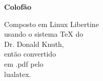 \vspace*{\fill}
	\begin{flushright}
	{\Large\textbf{Colofão}}

	{\large 
	Composto em Linux Libertine \\
	usando o sistema \TeX{} do \\
	Dr. Donald Knuth, \\
	então convertido \\
	em .pdf pelo \\
	lualatex. \\}
	\end{flushright}
